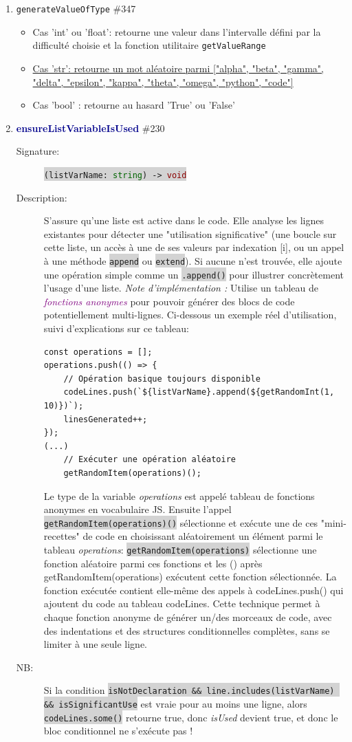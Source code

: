 \documentclass[11pt,a4paper]{article}
\newcommand{\code}[1]{\colorbox{lightgray}{\texttt{\small #1}}}
\newcommand{\var}[1]{\textit{#1}}
\newcommand{\vartype}[1]{\textcolor{darkgreen}{#1}}
\newcommand{\methodname}[1]{\textbf{\textcolor{darkblue}{#1}}}
\newcommand{\param}[1]{\code{#1}}
\newcommand{\rettype}[1]{\textcolor{darkred}{#1}}
\newcommand{\jsfunc}[1]{\textcolor{purple}{\textit{#1}}}
\begin{document}
\begin{enumerate}
    \item \texttt{generateValueOfType} \#347
    \begin{itemize}
        \item Cas 'int' ou 'float': retourne une valeur dans l'intervalle défini par la difficulté choisie et la fonction utilitaire \texttt{getValueRange}
        \item \underline{Cas 'str': retourne un mot aléatoire parmi ["alpha", "beta", "gamma", "delta", "epsilon", "kappa", "theta", "omega", "python", "code"]}
        \item Cas 'bool' : retourne au hasard 'True' ou 'False'
    \end{itemize}

\item \methodname{ensureListVariableIsUsed} \#230
    \begin{description}
        \item[Signature:] \code{(\param{listVarName}: \vartype{string}) -> \rettype{void}}
        \item[Description:] S'assure qu'une liste est active dans le code. Elle analyse les lignes existantes pour détecter une "utilisation significative" (une boucle sur cette liste, un accès à une de ses valeurs par indexation [i], ou un appel à une méthode \code{append} ou \code{extend}). Si aucune n'est trouvée, elle ajoute une opération simple comme un \code{.append()} pour illustrer concrètement l'usage d'une liste.
        \textit{Note d'implémentation :} Utilise un tableau de \jsfunc{fonctions anonymes} pour pouvoir générer des blocs de code potentiellement multi-lignes.  Ci-dessous un exemple réel d'utilisation, suivi d'explications sur ce tableau:
\begin{verbatim}
const operations = [];
operations.push(() => {                 
    // Opération basique toujours disponible
    codeLines.push(`${listVarName}.append(${getRandomInt(1, 10)})`);
    linesGenerated++;
});
(...)
    // Exécuter une opération aléatoire
    getRandomItem(operations)();
\end{verbatim}
Le type de la variable \var{operations} est appelé tableau de fonctions anonymes en vocabulaire JS.
Ensuite l'appel \code{getRandomItem(operations)()} sélectionne et exécute une de ces "mini-recettes" de code en choisissant aléatoirement un élément parmi le tableau \var{operations}: \code{getRandomItem(operations)} sélectionne une fonction aléatoire parmi ces fonctions et les () après getRandomItem(operations) exécutent cette fonction sélectionnée. 
La fonction exécutée contient elle-même des appels à codeLines.push() qui ajoutent du code au tableau codeLines.
Cette technique permet à chaque fonction anonyme de générer un/des morceaux de code, avec des indentations et des structures conditionnelles complètes, sans se limiter à une seule ligne.
    \item[NB:] Si la condition \code{isNotDeclaration \&\& line.includes(listVarName) \&\& isSignificantUse} est vraie pour au moins une ligne, alors \code{codeLines.some()} retourne true, donc \var{isUsed} devient true, et donc le bloc conditionnel ne s'exécute pas !
    \end{description}


\end{enumerate}
\end{document}
